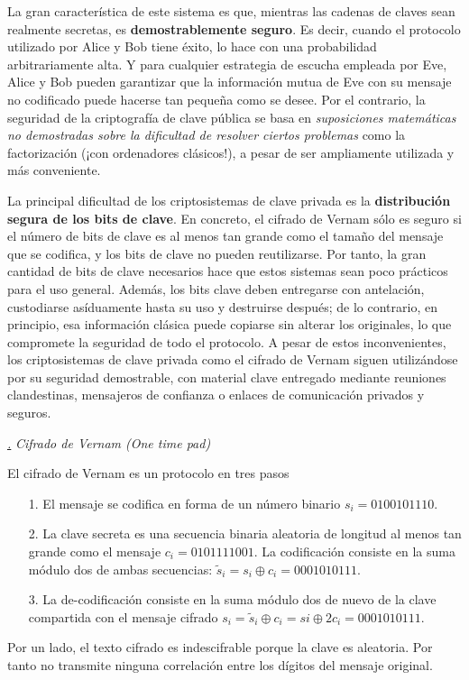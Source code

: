 \documentclass[a4paper,11pt]{book} %
\numberwithin{equation}{chapter}
\def\subsubiContadorIt{\par\addtocounter{subsubsection}{1}\underline{\it\thesubsubsection.}\hskip0.5cm \setcounter{subsubsubsectionIt}{0}}
\newcommand{\SubsubiIt}[1]{
		\subsubiContadorIt \textit{#1}
	}
\newcounter{subsubsubsectionIt}[subsubsection]
\begin{document}
La gran característica de este sistema es que, mientras las cadenas de claves sean realmente secretas, es \textbf{demostrablemente seguro}. Es decir, cuando el protocolo utilizado por Alice y Bob tiene éxito, lo hace con una probabilidad arbitrariamente alta.  Y para cualquier estrategia de escucha empleada por Eve, Alice y Bob pueden garantizar que la información mutua de Eve con su mensaje no codificado puede hacerse tan pequeña como se desee. Por el contrario, la seguridad de la criptografía de clave pública se basa en \textit{suposiciones matemáticas no demostradas sobre la dificultad de resolver ciertos problemas} como la factorización (¡con ordenadores clásicos!), a pesar de ser ampliamente utilizada y más conveniente.

La principal dificultad de los criptosistemas de clave privada es la \textbf{distribución segura de los bits de clave}. En concreto, el cifrado de Vernam sólo es seguro si el número de bits de clave es al menos tan grande como el tamaño del mensaje que se codifica, y los bits de clave no pueden reutilizarse. Por tanto, la gran cantidad de bits de clave necesarios hace que estos sistemas sean poco prácticos para el uso general. Además, los bits clave deben entregarse con antelación, custodiarse asíduamente hasta su uso y destruirse después; de lo contrario, en principio, esa información clásica puede copiarse sin alterar los originales, lo que compromete la seguridad de todo el protocolo. A pesar de estos inconvenientes, los criptosistemas de clave privada como el cifrado de Vernam siguen utilizándose por su seguridad demostrable, con material clave entregado mediante reuniones clandestinas, mensajeros de confianza o enlaces de comunicación privados y seguros.

			\SubsubiIt{Cifrado de Vernam (One time pad)}

El cifrado de Vernam es un protocolo en tres pasos
\begin{itemize}
	\item[1.] El mensaje se codifica en forma de un número binario $s_i = 0100101110$.
	\item[2.] La clave secreta es una secuencia binaria aleatoria de longitud al menos tan grande como el mensaje $c_i = 0101111001$. La codificación consiste en la suma módulo dos de ambas secuencias: 
	$\tilde{s}_i = s_i \oplus c_i = 0001010111$.
	\item[3.] La de-codificación consiste en la suma módulo dos de nuevo de la clave compartida con el mensaje cifrado $s_i = \tilde{s}_i \oplus c_i = si \oplus 2c_i = 0001010111$.
\end{itemize}
Por un lado, el texto cifrado es indescifrable porque la clave es aleatoria. Por tanto no transmite ninguna correlación entre los dígitos del mensaje original.
\end{document}
